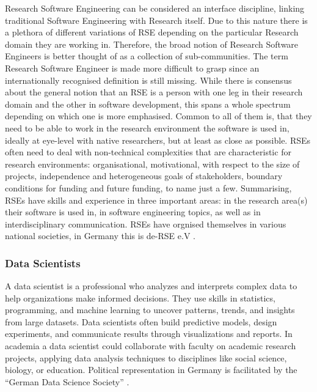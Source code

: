 \documentclass[
        english,biblatex
    ]{lni}
\begin{document}
    Research Software Engineering can be considered an interface
    discipline, linking traditional Software Engineering with Research
    itself. Due to this nature there is a plethora of different
    variations of RSE depending on the particular Research domain they
    are working in. Therefore, the broad notion of Research Software
    Engineers is better thought of as a collection of sub-communities.
    The term Research Software Engineer is made more difficult to grasp
    since an internationally recognised definition is still missing.
    While there is consensus about the general notion that an RSE is a
    person with one leg in their research domain and the other in
    software development, this spans a whole spectrum depending on which
    one is more emphasised. Common to all of them is, that they need to
    be able to work in the research environment the software is used in,
    ideally at eye-level with native researchers, but at least as close
    as possible. RSEs often need to deal with non-technical complexities
    that are characteristic for research environments: organisational,
    motivational, with respect to the size of projects, independence and
    heterogeneous goals of stakeholders, boundary conditions for funding
    and future funding, to name just a few. Summarising, RSEs have
    skills and experience in three important areas: in the research
    area(s) their software is used in, in software engineering topics,
    as well as in interdisciplinary communication. RSEs have orgnised
    themselves in various national societies, in Germany this is de-RSE
    e.V \cite{derseev}.

    \subsubsection{Data Scientists}\label{data-scientists}

    A data scientist is a professional who analyzes and interprets
    complex data to help organizations make informed decisions. They use
    skills in statistics, programming, and machine learning to uncover
    patterns, trends, and insights from large datasets. Data scientists
    often build predictive models, design experiments, and communicate
    results through visualizations and reports. In academia a data
    scientist could collaborate with faculty on academic research
    projects, applying data analysis techniques to disciplines like
    social science, biology, or education. Political representation in
    Germany is facilitated by the ``German Data Science Society''
    \cite{gds}.
\end{document}
